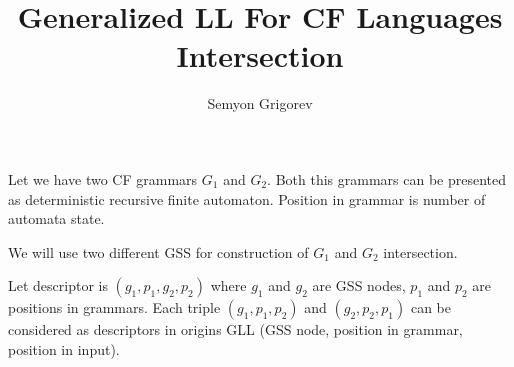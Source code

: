 \documentclass[12pt]{article}  %
\title{Generalized LL For CF Languages Intersection}
\author{Semyon Grigorev}
\theoremstyle{definition}
\theoremstyle{remark}
\begin{document}
\maketitle

Let we have two CF grammars $G_1$ and $G_2$. 
Both this grammars can be presented as deterministic recursive finite automaton.
Position in grammar is number of automata state.

We will use two different GSS for construction of $G_1$ and $G_2$ intersection.

Let descriptor is $(g_1,p_1,g_2,p_2)$ where $g_1$ and $g_2$ are GSS nodes, $p_1$ and $p_2$ are 
positions in grammars. Each triple $(g_1, p_1, p_2)$ and $(g_2, p_2, p_1)$ can be considered as 
descriptors in origins GLL (GSS node, position in grammar, position in input). 
\end{document}
